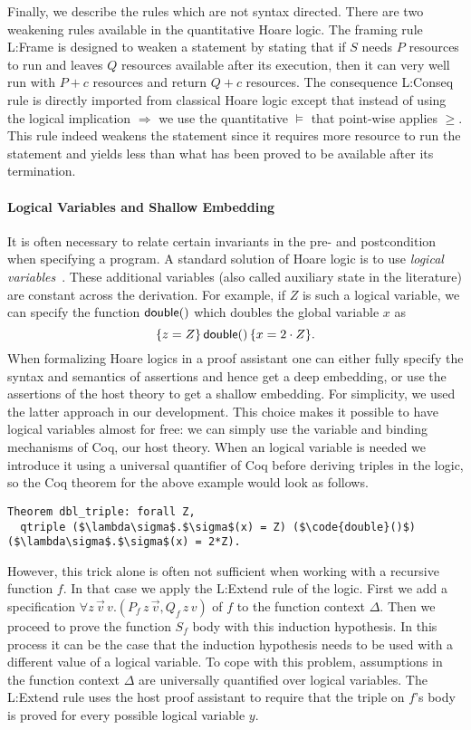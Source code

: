 \documentclass[nocopyrightspace,preprint]{sigplanconf}
\begin{document}
Finally, we describe the rules which are not syntax directed.  There
are two weakening rules available in the quantitative Hoare logic.
The framing rule {\sc L:Frame} is designed to weaken a statement by
stating that if $S$ needs $P$ resources to run and leaves $Q$
resources available after its execution, then it can very well run
with $P + c$ resources and return $Q + c$ resources.  The consequence
{\sc L:Conseq} rule is directly imported from classical Hoare logic
except that instead of using the logical implication $\Rightarrow$ we
use the quantitative $\models$ that point-wise applies $\ge$.  This
rule indeed weakens the statement since it requires more resource to
run the statement and yields less than what has been proved to be
available after its termination.


\paragraph{Logical Variables and Shallow Embedding}

It is often necessary to relate certain invariants in the pre- and
postcondition when specifying a program.  A standard solution of Hoare
logic is to use \emph{logical variables}~\cite{Kleymann99}.  These
additional variables (also called auxiliary state in the literature)
are constant across the derivation.  For example, if $Z$ is such
a logical variable, we can specify the function $\mathsf{double}()$
which doubles the global variable $x$ as
$$
  \{z = Z\}\, \mathsf{double}()\, \{x = 2 \cdot Z\}.
$$
%
When formalizing Hoare logics in a proof assistant one can either
fully specify the syntax and semantics of assertions and hence get a
deep embedding, or use the assertions of the host theory to get a
shallow embedding.  For simplicity, we used the latter approach in our
development.  This choice makes it possible to have logical variables
almost for free: we can simply use the variable and binding mechanisms
of Coq, our host theory.  When an logical variable is needed we
introduce it using a universal quantifier of Coq before deriving
triples in the logic, so the Coq theorem for the above example would
look as follows.
%
\begin{lstlisting}
Theorem dbl_triple: forall Z,
  qtriple ($\lambda\sigma$.$\sigma$(x) = Z) ($\code{double}()$) ($\lambda\sigma$.$\sigma$(x) = 2*Z).
\end{lstlisting}
%
However, this trick alone is often not sufficient when working with a
recursive function $f$.  In that case we apply the {\sc L:Extend} rule
of the logic.  First we add a specification $\forall z\,\vec
v\,v.(P_f\,z\,\vec v, Q_f\,z\,v)$ of $f$ to the function context
$\Delta$.  Then we proceed to prove the function $S_f$ body with this
induction hypothesis.  In this process it can be the case that the
induction hypothesis needs to be used with a different value of a
logical variable.  To cope with this problem, assumptions in the
function context $\Delta$ are universally quantified over logical
variables.  The {\sc L:Extend} rule uses the host proof assistant to
require that the triple on $f$'s body is proved for every possible
logical variable $y$.
\end{document}
